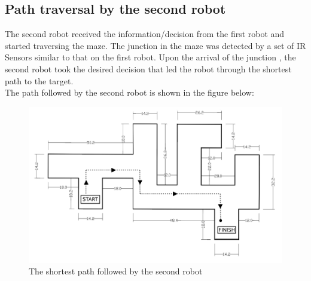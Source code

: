 \subsection{Path traversal by the second robot}
The second robot received the information/decision from the first robot and started traversing the maze. The junction in the maze was detected by a set of IR Sensors similar to that on the first robot.  Upon the arrival of the junction ,  the second robot took the desired decision that led the robot through the shortest path to the target.\\
The path followed by the second robot is shown in the figure below:
\newpage
\begin{figure}[h]
\center
 \includegraphics[scale=0.067]{mazetraverse_shortest_newnew.jpg} 
\caption{The shortest path followed by the second robot}
\end{figure}
